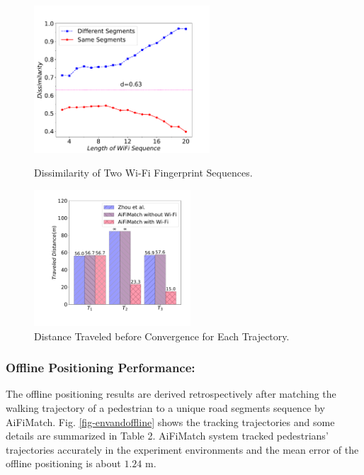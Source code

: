 \documentclass{llncs}
\begin{document}
\begin{figure}[!htbp]
	\vspace{-10pt}
	\begin{minipage}[t]{0.5\textwidth}
		\centering
		\includegraphics[width=2.58in]{AiFiMatch-WiFiDist}
		\caption{Dissimilarity of Two Wi-Fi Fingerprint Sequences.}
		\label{fig-wifidist}
	\end{minipage}
	\hfil
	\begin{minipage}[t]{0.46\textwidth}
		\centering
		\includegraphics[width=2.3in]{AiFiMatch-Convergence}
		\caption{Distance Traveled before Convergence for Each Trajectory.}
		\label{fig-converg}
	\end{minipage}

\end{figure}

\subsubsection{Offline Positioning Performance:}

The offline positioning results are derived retrospectively after matching the walking trajectory of a pedestrian to a unique road segments sequence by AiFiMatch. Fig. \ref{fig-envandoffline} shows the tracking trajectories and some details are summarized in Table 2. AiFiMatch system tracked pedestrians' trajectories accurately in the experiment environments and the mean error of the offline positioning is about $1.24$ m.
\end{document}
